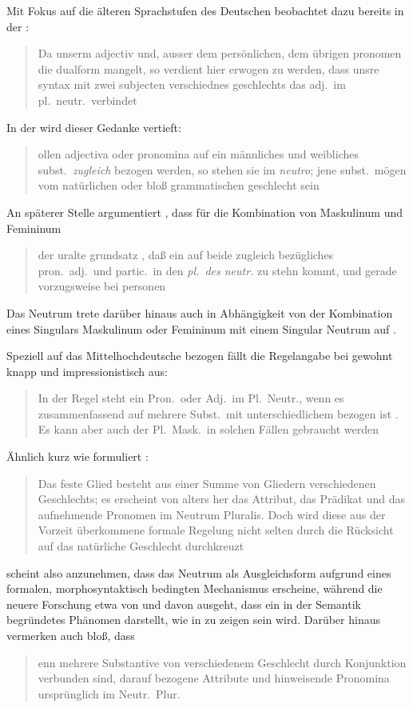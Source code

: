 Mit Fokus auf die älteren Sprachstufen des Deutschen beobachtet dazu bereits
\citeauthor{grimm1848} in der :
\blockcquote[978]{grimm1848}{Da unserm adjectiv und, ausser dem
persönlichen, dem übrigen pronomen die dualform mangelt, so verdient
hier erwogen zu werden, dass unsre syntax mit zwei subjecten verschiednes
geschlechts das adj.\ im pl.~neutr.\ verbindet}. In der  wird dieser Gedanke vertieft:
\blockcquote[311--312]{grimm1890}{ollen adjectiva oder pronomina
auf ein männliches und weibliches subst.\ \emph{zugleich} bezogen werden, so
stehen sie im \emph{neutro}; jene subst.\ mögen vom natürlichen oder bloß
grammatischen geschlecht sein}. An späterer Stelle argumentiert
\citeauthor{grimm1898}, dass für die Kombination von Maskulinum und Femininum
\blockcquote[329]{grimm1898}{der uralte grundsatz , daß ein auf
beide zugleich bezügliches pron.\ adj.\ und partic.\ in den \emph{pl.\ des
\mbox{neutr.}} zu stehn kommt, und gerade vorzugsweise bei personen}. Das
Neutrum trete darüber hinaus auch in Abhängigkeit von der Kombination eines
Singulars Maskulinum oder Femininum mit einem Singular Neutrum auf
\autocite[331]{grimm1898}.

Speziell auf das Mittelhochdeutsche bezogen fällt die
Regelangabe bei \citeauthor{paul2007} gewohnt knapp und impressionistisch aus:
\blockcquote[384]{paul2007}{In der Regel steht ein Pron.\ oder Adj.\ im
Pl.~Neutr., wenn es zusammenfassend auf mehrere Subst.\ mit unterschiedlichem
 bezogen ist \textelp{}. Es kann aber auch der Pl.~Mask.\ in solchen
Fällen gebraucht werden}. Ähnlich kurz wie \citet{paul2007} formuliert
\citet[39]{behaghel1928}: \blockquote{Das feste Glied besteht aus einer Summe
von Gliedern verschiedenen Geschlechts; es erscheint von alters her das
Attribut, das Prädikat und das aufnehmende Pronomen im Neutrum
Pluralis. \textelp{} Doch wird diese aus der Vorzeit überkommene formale
Regelung nicht selten durch die Rücksicht auf das natürliche Geschlecht
durchkreuzt}.

\citet{behaghel1928} scheint also anzunehmen, dass das Neutrum als
Ausgleichsform aufgrund eines formalen, morphosyntaktisch bedingten Mechanismus
erscheine, während die neuere Forschung etwa von \citet{wechslerzlatic2003} und
\citet{wechsler2009} davon ausgeht, dass  ein in der
Semantik begründetes Phänomen darstellt, wie in  zu
zeigen sein wird. Darüber hinaus vermerken auch \citet[188]{dal2014} bloß, dass
\blockquote{enn mehrere Substantive von verschiedenem Geschlecht
durch Konjunktion verbunden sind, \textelp{} darauf bezogene
Attribute und hinweisende Pronomina ursprünglich im Neutr.\ Plur.\
}.

